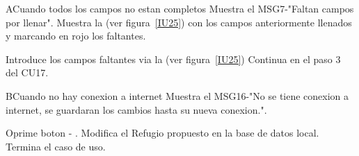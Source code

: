 \begin{UCtrayectoriaA}{A}{Cuando todos los campos no estan completos}
	\UCpaso Muestra el MSG7-"Faltan campos por llenar".
	\UCpaso Muestra la (ver figura~\ref{IU25}) con los campos anteriormente llenados y marcando en rojo los faltantes.
	\item\UCactor Introduce los campos faltantes via la (ver figura~\ref{IU25})
	\UCpaso Continua en el paso 3 del CU17.
\end{UCtrayectoriaA}

\begin{UCtrayectoriaA}{B}{Cuando no hay conexion a internet}
	\UCpaso Muestra el MSG16-"No se tiene conexion a internet, se guardaran los cambios hasta su nueva conexion.".
	\item\UCactor Oprime boton - .
	\UCpaso Modifica el Refugio propuesto  en la base de datos local.	
	\UCpaso[] Termina el caso de uso.
\end{UCtrayectoriaA}